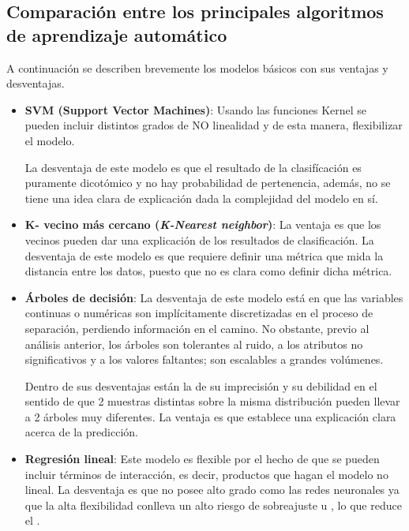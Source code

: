 \begin{figure}[H]
	\centering
	
	\label{fig:decision-tree}
\end{figure}


\subsection{Comparación entre los principales algoritmos de aprendizaje automático}
A continuación se describen brevemente los modelos básicos con sus ventajas y desventajas.

\begin{itemize}
\item \textbf{SVM (Support Vector Machines)}: Usando las funciones Kernel se pueden incluir distintos grados de NO linealidad y de esta manera, ﬂexibilizar el modelo.

La desventaja de este modelo es que el resultado de la clasifícación es puramente dicotómico y no hay probabilidad de pertenencia, además, no se tiene una idea clara de explicación dada la complejidad del modelo en sí.

\item \textbf{K- vecino más cercano (\textit{K-Nearest neighbor})}: La ventaja es que los vecinos pueden dar una explicación de los resultados de clasificación. La desventaja de este modelo es que requiere deﬁnir una métrica que mida la distancia entre los datos, puesto que no es clara como deﬁnir dicha métrica.

\item \textbf{Árboles de decisión}: La desventaja de este modelo está en que las variables continuas o numéricas son implícitamente discretizadas en el proceso de separación, perdiendo información en el camino. No obstante, previo al análisis anterior, los árboles son tolerantes al ruido, a los atributos no signiﬁcativos y a los valores faltantes; son escalables a grandes volúmenes.

Dentro de sus desventajas están la de su imprecisión y su debilidad en el sentido de que 2 muestras distintas sobre la misma distribución pueden llevar a 2 árboles muy diferentes. La ventaja es que establece una explicación clara acerca de la predicción.

\item \textbf{Regresión lineal}: Este modelo es ﬂexible por el hecho de que se pueden incluir términos de interacción, es decir, productos que hagan el modelo no lineal. La desventaja es que no posee alto grado como las redes neuronales ya que la alta ﬂexibilidad conlleva un alto riesgo de sobreajuste u , lo que reduce el .

\end{itemize}



